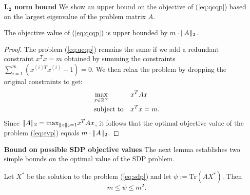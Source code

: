\noindent\textbf{$\mathbf{L_2}$ norm bound}
We show an  upper bound on the objective of (\ref{eq:qcqp}) based on the largest eigenvalue of the problem matrix $A$.
%
\begin{proposition}
The objective value of (\ref{eq:qcqp}) is upper bounded by $m \cdot \lVert A\rVert_2$.
\end{proposition}
\begin{proof}
The problem (\ref{eq:qcqp}) remains the same if we add a redundant constraint $x^T x = m$ obtained by summing the constraints $\sum_{i= 1}^{m} \left(x^{(i)T}x^{(i)} - 1\right) = 0$. We then relax the problem by dropping the original constraints to get:
\begin{equation}\label{eq:evp}
\begin{aligned}
& \underset{x \in \mathbb{R}^{N}}{\text{max}}
& & x^T A x\\
& \text{subject to}
& &x^{T} x = m.
\end{aligned}
\end{equation}
Since $\lVert A\rVert_2 = \text{max}_{\lVert x\rVert_2 = 1} x^T A x$, it follows that the optimal objective value of the problem (\ref{eq:evp}) equals $m \cdot \lVert A\rVert_2 $.
\end{proof}
%
\noindent\textbf{Bound on possible SDP objective values}
The next lemma establishes two simple bounds on the optimal value of the SDP problem.
\begin{lemma}\label{eq:lemsdp}
Let $X^*$ be the solution to the problem (\ref{eq:sdp}) and let $\psi := \mathrm{Tr}\left(A X^{*}\right)$. Then
$$m \leq \psi \leq m^2.$$
\end{lemma}

